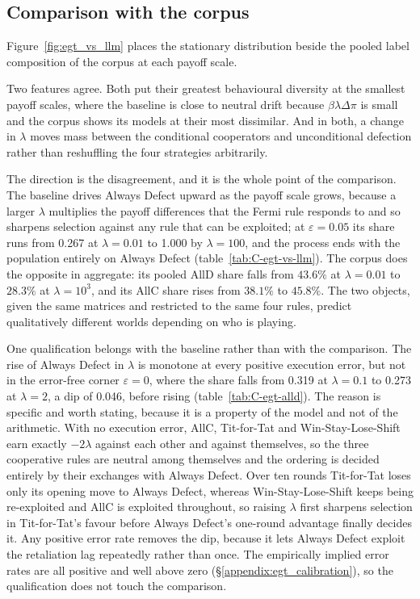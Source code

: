 \documentclass[openacc]{rsproca_new}
\newcommand{\lam}{\lambda}
\begin{document}


\subsection{Comparison with the corpus}\label{appendix:egt_vs_llm}

Figure~\ref{fig:egt_vs_llm} places the stationary distribution beside the
pooled label composition of the corpus at each payoff scale.

Two features agree. Both put their greatest behavioural diversity at the
smallest payoff scales, where the baseline is close to neutral drift because
$\beta \lam \Delta\pi$ is small and the corpus shows its models at their most
dissimilar. And in both, a change in $\lam$ moves mass between the conditional
cooperators and unconditional defection rather than reshuffling the four
strategies arbitrarily.

The direction is the disagreement, and it is the whole point of the comparison.
The baseline drives Always Defect upward as the payoff scale grows, because a
larger $\lam$ multiplies the payoff differences that the Fermi rule responds to
and so sharpens selection against any rule that can be exploited; at
$\varepsilon = 0.05$ its share runs from 0.267 at $\lam = 0.01$ to 1.000 by
$\lam = 100$, and the process ends with the population entirely on Always
Defect (table~\ref{tab:C-egt-vs-llm}). The corpus does the opposite in
aggregate: its pooled AllD share falls from $43.6\%$ at $\lam = 0.01$ to
$28.3\%$ at $\lam = 10^{3}$, and its AllC share rises from $38.1\%$ to
$45.8\%$. The two objects, given the same matrices and restricted to the same
four rules, predict qualitatively different worlds depending on who is playing.

One qualification belongs with the baseline rather than with the comparison.
The rise of Always Defect in $\lam$ is monotone at every positive execution
error, but not in the error-free corner $\varepsilon = 0$, where the share falls
from 0.319 at $\lam = 0.1$ to 0.273 at $\lam = 2$, a dip of 0.046, before rising
(table~\ref{tab:C-egt-alld}). The reason is
specific and worth stating, because it is a property of the model and not of
the arithmetic. With no execution error, AllC, Tit-for-Tat and
Win-Stay-Lose-Shift earn exactly $-2\lam$ against each other and against
themselves, so the three cooperative rules are neutral among themselves and the
ordering is decided entirely by their exchanges with Always Defect. Over ten
rounds Tit-for-Tat loses only its opening move to Always Defect, whereas
Win-Stay-Lose-Shift keeps being re-exploited and AllC is exploited throughout,
so raising $\lam$ first sharpens selection in Tit-for-Tat's favour before
Always Defect's one-round advantage finally decides it. Any positive error rate
removes the dip, because it lets Always Defect exploit the retaliation lag
repeatedly rather than once. The empirically implied error rates are all
positive and well above zero (\S\ref{appendix:egt_calibration}), so the
qualification does not touch the comparison.
\end{document}
